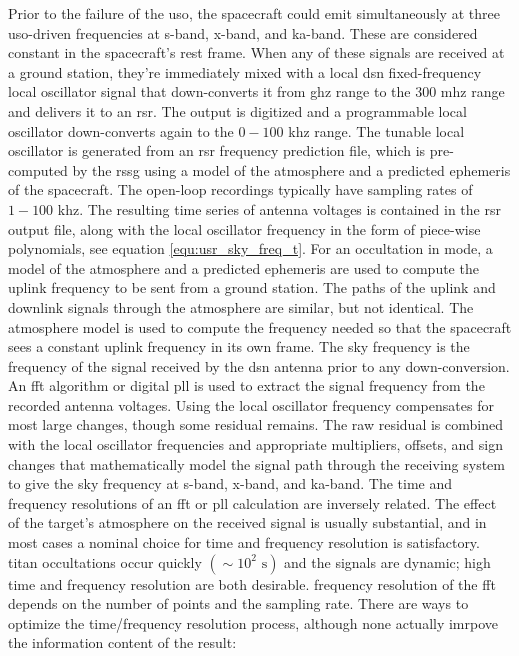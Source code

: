 \documentclass{article}
\theoremstyle{mystyle}
\begin{document}
Prior to the failure of the \gls{uso}, the spacecraft could emit simultaneously at three \gls{uso}-driven frequencies at \gls{s-band}, \gls{x-band}, and \gls{ka-band}. These are considered constant in the spacecraft's rest frame. When any of these signals are received at a ground station, they're immediately mixed with a local \gls{dsn} fixed-frequency local oscillator signal that down-converts it from \gls{ghz} range to the $300$ \gls{mhz} range and delivers it to an \gls{rsr}. The output is digitized and a programmable local oscillator down-converts again to the $0-100$ \gls{khz} range. The tunable local oscillator is generated from an \gls{rsr} \gls{frequency} prediction file, which is pre-computed by the \gls{rssg} using a model of the \gls{atmosphere} and a predicted \gls{ephemeris} of the spacecraft. The \gls{open-loop} recordings typically have sampling rates of $1-100$ \gls{khz}. The resulting time series of antenna voltages is contained in the \gls{rsr} output file, along with the local oscillator frequency in the form of piece-wise polynomials, see equation \ref{equ:usr_sky_freq_t}. For an \gls{occultation} in  mode, a model of the \gls{atmosphere} and a predicted \gls{ephemeris} are used to compute the \gls{uplink} \gls{frequency} to be sent from a ground station. The paths of the \gls{uplink} and \gls{downlink} signals through the \gls{atmosphere} are similar, but not identical. The \gls{atmosphere} model is used to compute the \gls{frequency} needed so that the spacecraft sees a constant \gls{uplink} \gls{frequency} in its own frame. The \gls{sky frequency} is the frequency of the signal received by the \gls{dsn} antenna prior to any down-conversion. An \gls{fft} algorithm or digital \gls{pll} is used to extract the signal frequency from the recorded antenna voltages. Using the local oscillator \gls{frequency} compensates for most large changes, though some residual remains. The raw residual is combined with the local oscillator frequencies and appropriate multipliers, offsets, and sign changes that mathematically model the signal path through the receiving system to give the \gls{sky frequency} at \gls{s-band}, \gls{x-band}, and \gls{ka-band}. The time and frequency resolutions of an \gls{fft} or \gls{pll} calculation are inversely related. The effect of the target's atmosphere on the received signal is usually substantial, and in most cases a nominal choice for time and frequency resolution is satisfactory. \gls{titan} \glspl{occultation} occur quickly $(\sim 10^{2}\textrm{ s})$ and the signals are dynamic; high time and \gls{frequency} \gls{resolution} are both desirable. \Gls{frequency} \gls{resolution} of the \gls{fft} depends on the number of points and the \gls{sampling rate}. There are ways to optimize the time/frequency resolution process, although none actually imrpove the information content of the result:
\end{document}
